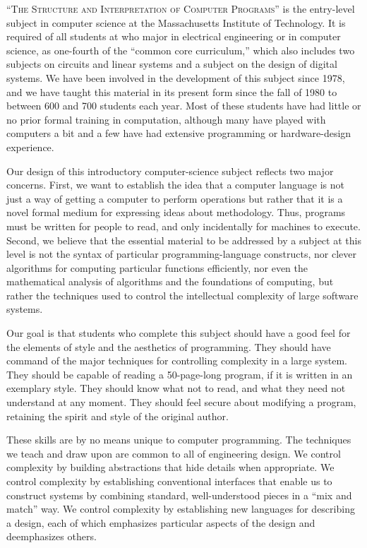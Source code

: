 
\noindent
\lettrine[lhang=0.17]{“T}{he Structure and Interpretation of Computer Programs”} is the entry-level subject in computer science at the Massachusetts Institute of Technology.
It is required of all students at  who major in electrical engineering or in computer science, as one-fourth of the “common core curriculum,” which also includes two subjects on circuits and linear systems and a subject on the design of digital systems.
We have been involved in the development of this subject since 1978, and we have taught this material in its present form since the fall of 1980 to between 600 and 700 students each year.
Most of these students have had little or no prior formal training in computation, although many have played with computers a bit and a few have had extensive programming or hardware-design experience.

Our design of this introductory computer-science subject reflects two major concerns.
First, we want to establish the idea that a computer language is not just a way of getting a computer to perform operations but rather that it is a novel formal medium for expressing ideas about methodology.
Thus, programs must be written for people to read, and only incidentally for machines to execute.
Second, we believe that the essential material to be addressed by a subject at this level is not the syntax of particular programming-language constructs, nor clever algorithms for computing particular functions efficiently, nor even the mathematical analysis of algorithms and the foundations of computing, but rather the techniques used to control the intellectual complexity of large software systems.

Our goal is that students who complete this subject should have a good feel for the elements of style and the aesthetics of programming.
They should have command of the major techniques for controlling complexity in a large system.
They should be capable of reading a 50-page-long program, if it is written in an exemplary style.
They should know what not to read, and what they need not understand at any moment.
They should feel secure about modifying a program, retaining the spirit and style of the original author.

These skills are by no means unique to computer programming.
The techniques we teach and draw upon are common to all of engineering design.
We control complexity by building abstractions that hide details when appropriate.
We control complexity by establishing conventional interfaces that enable us to construct systems by combining standard, well-understood pieces in a “mix and match” way.
We control complexity by establishing new languages for describing a design, each of which emphasizes particular aspects of the design and deemphasizes others.

